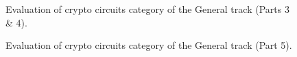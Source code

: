 \begin{figure}
	\noindent{}
	\caption{Evaluation of crypto circuits category of the General track (Parts 3 \& 4).}
	\label{fig:crci-2}
\end{figure}
	
\begin{figure}
	\noindent{}
	\caption{Evaluation of crypto circuits category of the General track (Part 5).}
	\label{fig:crci-5}
\end{figure}

